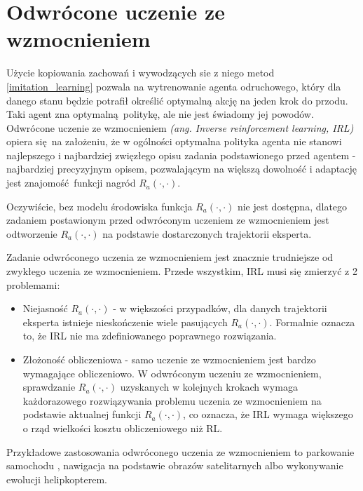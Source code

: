 \section{Odwrócone uczenie ze wzmocnieniem}
Użycie kopiowania zachowań i wywodzących sie z niego metod \ref{imitation_learning} pozwala na wytrenowanie agenta odruchowego, który dla danego stanu będzie potrafił określić optymalną akcję na jeden krok do przodu. Taki agent zna optymalną politykę, ale nie jest świadomy jej powodów. Odwrócone uczenie ze wzmocnieniem  \textit{(ang. Inverse reinforcement learning, IRL)} opiera się na założeniu, że w ogólności optymalna polityka agenta nie stanowi najlepszego i najbardziej zwięzłego opisu zadania podstawionego przed agentem - najbardziej precyzyjnym opisem, pozwalającym na większą dowolność i adaptację jest znajomość funkcji nagród $R_a(\cdot,\cdot)$.

Oczywiście, bez modelu środowiska funkcja $R_a(\cdot,\cdot)$ nie jest dostępna, dlatego zadaniem postawionym przed odwróconym uczeniem ze wzmocnieniem jest odtworzenie $R_a(\cdot,\cdot)$ na podstawie dostarczonych trajektorii eksperta.

Zadanie odwróconego uczenia ze wzmocnieniem jest znacznie trudniejsze od zwykłego uczenia ze wzmocnieniem. Przede wszystkim, IRL musi się zmierzyć z 2 problemami:

\begin{itemize}
\item Niejasność $R_a(\cdot,\cdot)$ - w większości przypadków, dla danych trajektorii eksperta istnieje nieskończenie wiele pasujących $R_a(\cdot,\cdot)$. Formalnie oznacza to, że IRL nie ma zdefiniowanego poprawnego rozwiązania.
\item Złożoność obliczeniowa - samo uczenie ze wzmocnieniem jest bardzo wymagające obliczeniowo. W odwróconym uczeniu ze wzmocnieniem, sprawdzanie $R_a(\cdot,\cdot)$ uzyskanych w kolejnych krokach wymaga każdorazowego rozwiązywania problemu uczenia ze wzmocnieniem na podstawie aktualnej funkcji $R_a(\cdot,\cdot)$, co oznacza, że IRL wymaga większego o rząd wielkości kosztu obliczeniowego niż RL.
\end{itemize}

Przykładowe zastosowania odwróconego uczenia ze wzmocnieniem to parkowanie samochodu \cite{DBLP:conf/iros/AbbeelDNT08}, nawigacja na podstawie obrazów satelitarnych \cite{Ratliff:2006:MMP:1143844.1143936} albo wykonywanie ewolucji helipkopterem\cite{DBLP:journals/cacm/CoatesAN09}.


